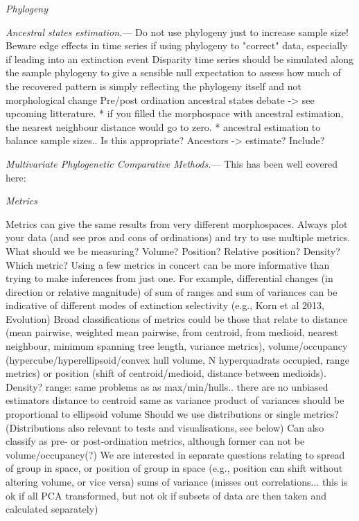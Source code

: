 \documentclass[12pt,letterpaper]{article}
\renewcommand{\subsection}[1]{%
\bigskip
\begin{center}
\begin{large}
\normalfont\itshape #1
\end{large}
\end{center}}
\renewcommand{\subsubsection}[1]{%
\vspace{2ex}
\noindent
\textit{#1.}---}
\begin{document}
\subsection{Phylogeny}
\subsubsection{Ancestral states estimation}
Do not use phylogeny just to increase sample size!
Beware edge effects in time series if using phylogeny to "correct" data, especially if leading into an extinction event
Disparity time series should be simulated along the sample phylogeny to give a sensible null expectation to assess how much of the recovered pattern is simply reflecting the phylogeny itself and not morphological change
Pre/post ordination ancestral states debate -> see upcoming litterature.
* if you filled the morphospace with ancestral estimation, the nearest neighbour distance would go to zero. 
* ancestral estimation to balance sample sizes.. Is this appropriate?
Ancestors -> estimate? Include?

\subsubsection{Multivariate Phylogenetic Comparative Methods}
This has been well covered here: %


\subsection{Metrics}
Metrics can give the same results from very different morphospaces. Always plot your data (and see pros and cons of ordinations) and try to use multiple metrics.
What should we be measuring? Volume? Position? Relative position? Density? Which metric? Using a few metrics in concert can be more informative than trying to make inferences from just one. For example, differential changes (in direction or relative magnitude) of sum of ranges and sum of variances can be indicative of different modes of extinction selectivity (e.g., Korn et al 2013, Evolution)
Broad classifications of metrics could be those that relate to distance (mean pairwise, weighted mean pairwise, from centroid, from medioid, nearest neighbour, minimum spanning tree length, variance metrics), volume/occupancy (hypercube/hyperellipsoid/convex hull volume, N hyperquadrats occupied, range metrics) or position (shift of centroid/medioid, distance between medioids). Density?
range: same problems as as max/min/hulls.. there are no unbiased estimators
distance to centroid same as variance
product of variances should be proportional to ellipsoid volume
Should we use distributions or single metrics? (Distributions also relevant to tests and visualisations, see below)
Can also classify as pre- or post-ordination metrics, although former can not be volume/occupancy(?)
We are interested in separate questions relating to spread of group in space, or position of group in space (e.g., position can shift without altering volume, or vice versa)
sums of variance (misses out correlations... this is ok if all PCA transformed, but not ok if subsets of data are then taken and calculated separately)
\end{document}
